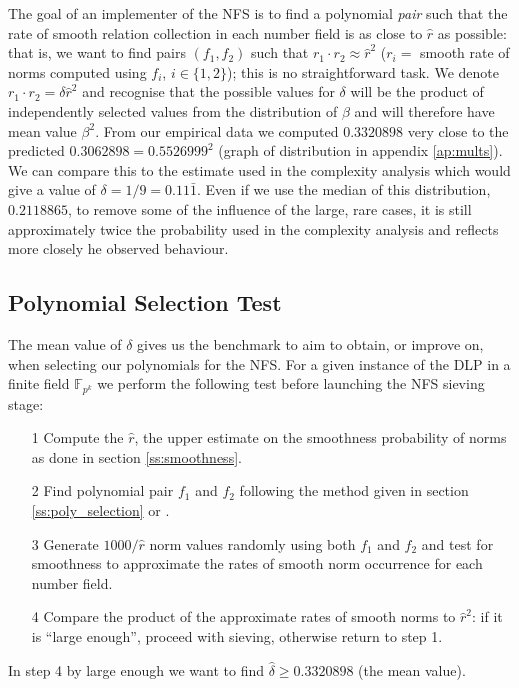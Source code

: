 \documentclass[a4paper, 10pt, envcountsect, runningheads]{article}
\newcommand{\F}{{\mathbb F}}
\numberwithin{figure}{section}
\numberwithin{equation}{section}
\begin{document}
The goal of an implementer of the NFS is to find a polynomial {\em pair} such that the rate of smooth relation collection in each number field is as close to $\hat{r}$ as possible: that is, we want to find pairs $(f_1,f_2)$ such that $r_1\cdot r_2\approx\hat{r}^2$ ($r_i=$ smooth rate of norms computed using $f_i$, $i\in\{1,2\}$); this is no straightforward task. We denote $r_1\cdot r_2=\delta\hat{r}^2$ and recognise that the possible values for $\delta$ will be the product of independently selected values from the distribution of $\beta$ and will therefore have mean value $\beta^2$. From our empirical data we computed $0.3320898$ very close to the predicted $0.3062898=0.5526999^2$ (graph of distribution in appendix \ref{ap:mults}). We can compare this to the estimate used in the complexity analysis which would give a value of $\delta=1/9=0.11\bar{1}$. Even if we use the median of this distribution, $0.2118865$, to remove some of the influence of the large, rare cases, it is still approximately twice the probability used in the complexity analysis and reflects more closely he observed behaviour.
\newpage
\subsection{Polynomial Selection Test}
\label{ss:poly_test}
The mean value of $\delta$ gives us the benchmark to aim to obtain, or improve on, when selecting our polynomials for the NFS. For a given instance of the DLP in a finite field $\F_{p^k}$ we perform the following test before launching the NFS sieving stage:
\begin{itemize}
\item[1] Compute the $\hat{r}$, the upper estimate on the smoothness probability of norms as done in section \ref{ss:smoothness}.
\item[2] Find polynomial pair $f_1$ and $f_2$ following the method given in section \ref{ss:poly_selection} or \cite{joux-lercier-smart-vercauteren06}.
\item[3] Generate $1000/\hat{r}$ \cite{dan_predicting_nfs} norm values randomly using both $f_1$ and $f_2$ and test for smoothness to approximate the rates of smooth norm occurrence for each number field.
\item[4] Compare the product of the approximate rates of smooth norms to $\hat{r}^2$: if it is ``large enough'', proceed with sieving, otherwise return to step 1.
\end{itemize}
In step 4 by large enough we want to find $\hat{\delta}\geq0.3320898$ (the mean value).
\end{document}
